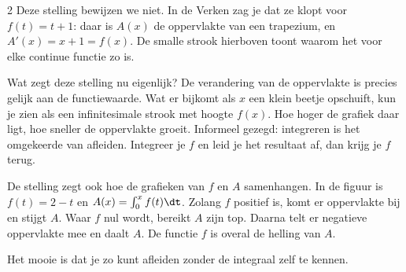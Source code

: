 \begin{alleenvoor}{2}
Deze stelling bewijzen we niet. In de Verken zag je dat ze klopt voor $f(t) = t + 1$: daar is $A(x)$ de oppervlakte van een trapezium, en $A'(x) = x + 1 = f(x)$. De smalle strook hierboven toont waarom het voor elke continue functie zo is.

\end{alleenvoor}
Wat zegt deze stelling nu eigenlijk? De verandering van de oppervlakte is precies gelijk aan de functiewaarde. Wat er bijkomt als $x$ een klein beetje opschuift, kun je zien als een infinitesimale strook met hoogte $f(x)$. Hoe hoger de grafiek daar ligt, hoe sneller de oppervlakte groeit. Informeel gezegd: integreren is het omgekeerde van afleiden. Integreer je $f$ en leid je het resultaat af, dan krijg je $f$ terug.

De stelling zegt ook hoe de grafieken van $f$ en $A$ samenhangen. In de figuur is $f(t) = 2 - t$ en $A(x) = \int_0^x f(t)\dt$. Zolang $f$ positief is, komt er oppervlakte bij en stijgt $A$. Waar $f$ nul wordt, bereikt $A$ zijn top. Daarna telt er negatieve oppervlakte mee en daalt $A$. De functie $f$ is overal de helling van $A$.


Het mooie is dat je zo kunt afleiden zonder de integraal zelf te kennen.


